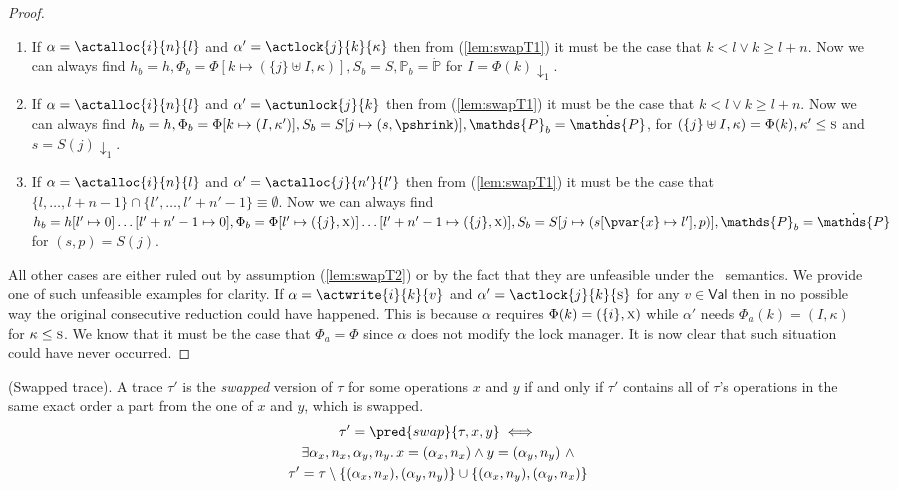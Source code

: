 \begin{lem}
\begin{proof}
\begin{enumerate}[label=({\roman*})]
		\item If $\alpha = \actalloc{i}{n}{l}$ and $\alpha' = \actlock{j}{k}{\kappa}$ then from (\ref{lem:swapT1}) it must be the case that $k < l \lor k \geq l + n$. Now we can always find $h_b = h, \Phi_b = \Phi[k \mapsto (\{j\} \uplus I, \kappa)], S_b = S, \mathds{P}_b = \dot{\mathds{P}}$ for $I = \Phi(k) \downarrow_1$.
		
		\item If $\alpha = \actalloc{i}{n}{l}$ and $\alpha' = \actunlock{j}{k}$ then from (\ref{lem:swapT1}) it must be the case that $k < l \lor k \geq l + n$. Now we can always find $h_b = h, \Phi_b = \Phi[k \mapsto (I, \kappa')], S_b = S[j \mapsto (s, \pshrink)], \mathds{P}_b = \dot{\mathds{P}}$, for $(\{j\} \uplus I, \kappa) = \Phi(k), \kappa' \leq \textsc{s}$ and $s = S(j) \downarrow_1$.
		
		\item If $\alpha = \actalloc{i}{n}{l}$ and $\alpha' = \actalloc{j}{n'}{l'}$ then from (\ref{lem:swapT1}) it must be the case that $\{l, \ldots, l + n - 1\} \cap \{l', \ldots, l' + n' -1 \} \equiv \emptyset$. Now we can always find $h_b = h[l' \mapsto 0]\ldots[l' + n' - 1 \mapsto 0], \Phi_b = \Phi[l' \mapsto (\{j\}, \textsc{x})]\ldots[l' + n' - 1 \mapsto (\{j\}, \textsc{x})], S_b = S[j \mapsto (s[\pvar{x} \mapsto l'], p)], \mathds{P}_b = \dot{\mathds{P}}$ for $(s, p) = S(j)$.
	\end{enumerate}
	All other cases are either ruled out by assumption (\ref{lem:swapT2}) or by the fact that they are unfeasible under the \tpl\ semantics. We provide one of such unfeasible examples for clarity. If $\alpha = \actwrite{i}{k}{v}$ and $\alpha' = \actlock{j}{k}{\textsc{s}}$ for any $v \in \mathsf{Val}$ then in no possible way the original consecutive reduction could have happened. This is because $\alpha$ requires $\Phi(k) = (\{i\}, \textsc{x})$ while $\alpha'$ needs $\Phi_a(k) = (I, \kappa)$ for $\kappa \leq \textsc{s}$. We know that it must be the case that $\Phi_a = \Phi$ since $\alpha$ does not modify the lock manager. It is now clear that such situation could have never occurred.
	\end{proof}
\end{lem}

\begin{defn}
	(Swapped trace).
	A trace $\tau'$ is the \emph{swapped} version of $\tau$ for some operations $x$ and $y$ if and only if $\tau'$ contains all of $\tau$'s operations in the same exact order a part from the one of $x$ and $y$, which is swapped.
	\begin{gather*}
		\tau' = \pred{swap}{\tau, x, y}
		\iff \\
		\exists \alpha_x, n_x, \alpha_y, n_y \ldotp x = (\alpha_x, n_x) \land y = (\alpha_y, n_y)\ \land \\
		\tau' = \tau \setminus \{(\alpha_x, n_x), (\alpha_y, n_y)\} \cup \{ (\alpha_x, n_y), (\alpha_y, n_x) \}
	\end{gather*}
\end{defn}

